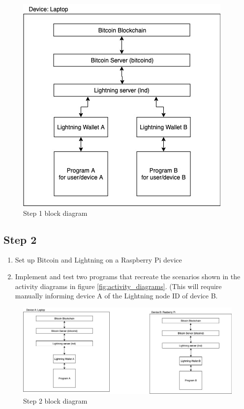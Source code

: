 \begin{figure}[h!]
\centering
\includegraphics[scale=0.5]{Figures/step1.jpg}
\caption{Step 1 block diagram}
\label{fig:step1}
\end{figure}


\subsection{Step 2}

\begin{enumerate}[label=\alph*)]
    \item Set up Bitcoin and Lightning on a Raspberry Pi device
    \item Implement and test two programs that recreate the scenarios shown in the activity diagrams in figure \ref{fig:activity_diagrams}. (This will require manually informing device A of the Lightning node ID of device B.
\end{enumerate}

\begin{figure}[h!]
\includegraphics[scale=0.5]{Figures/step2.jpg}
\caption{Step 2 block diagram}
\label{fig:step2}
\end{figure}

